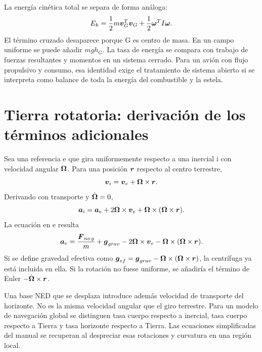La energía cinética total se separa de forma análoga:
\begin{equation}
E_k=\frac12m\boldsymbol{v}_G^T\boldsymbol{v}_G+\frac12\boldsymbol{\omega}^TI\boldsymbol{\omega}.
\end{equation}
El término cruzado desaparece porque G es centro de masa. En un campo uniforme se puede añadir $mgh_G$. La tasa de energía se compara con trabajo de fuerzas resultantes y momentos en un sistema cerrado. Para un avión con flujo propulsivo y consumo, esa identidad exige el tratamiento de sistema abierto si se interpreta como balance de toda la energía del combustible y la estela.

\section{Tierra rotatoria: derivación de los términos adicionales}
Sea una referencia e que gira uniformemente respecto a una inercial i con velocidad angular $\boldsymbol{\Omega}$. Para una posición $\boldsymbol{r}$ respecto al centro terrestre,
\begin{equation}
\boldsymbol{v}_i=\boldsymbol{v}_e+\boldsymbol{\Omega}\times\boldsymbol{r}.
\end{equation}
Derivando con transporte y $\dot{\boldsymbol{\Omega}}=0$,
\begin{equation}
\boldsymbol{a}_i=\boldsymbol{a}_e+2\boldsymbol{\Omega}\times\boldsymbol{v}_e
+\boldsymbol{\Omega}\times(\boldsymbol{\Omega}\times\boldsymbol{r}).
\end{equation}
La ecuación en e resulta
\begin{equation}
\boldsymbol{a}_e=\frac{\boldsymbol{F}_{no\,g}}m+\boldsymbol{g}_{grav}
-2\boldsymbol{\Omega}\times\boldsymbol{v}_e
-\boldsymbol{\Omega}\times(\boldsymbol{\Omega}\times\boldsymbol{r}).
\end{equation}
Si se define gravedad efectiva como $\boldsymbol{g}_{ef}=\boldsymbol{g}_{grav}-\boldsymbol{\Omega}\times(\boldsymbol{\Omega}\times\boldsymbol{r})$, la centrífuga ya está incluida en ella. Si la rotación no fuese uniforme, se añadiría el término de Euler $-\dot{\boldsymbol{\Omega}}\times\boldsymbol{r}$.

Una base NED que se desplaza introduce además velocidad de transporte del horizonte. No es la misma velocidad angular que el giro terrestre. Para un modelo de navegación global se distinguen tasa cuerpo respecto a inercial, tasa cuerpo respecto a Tierra y tasa horizonte respecto a Tierra. Las ecuaciones simplificadas del manual se recuperan al despreciar esas rotaciones y curvatura en una región local.


